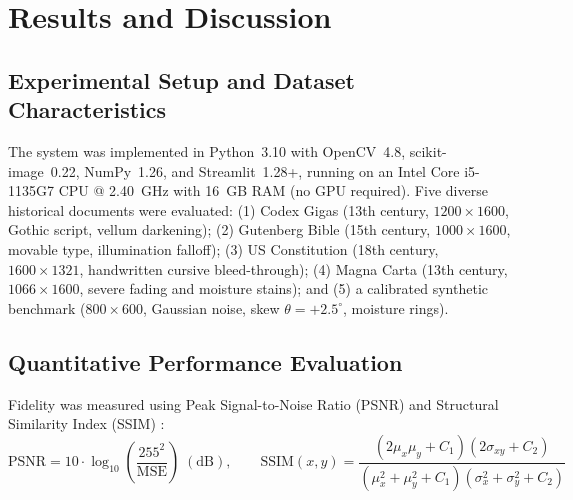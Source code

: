 \documentclass[11pt, a4paper]{article}
\begin{document}
\section{Results and Discussion}

\subsection{Experimental Setup and Dataset Characteristics}
The system was implemented in Python~3.10 with OpenCV~4.8, scikit-image~0.22, NumPy~1.26, and Streamlit~1.28+, running on an Intel Core i5-1135G7 CPU @ 2.40~GHz with 16~GB RAM (no GPU required). Five diverse historical documents were evaluated: (1) Codex Gigas (13th century, $1200 \times 1600$, Gothic script, vellum darkening); (2) Gutenberg Bible (15th century, $1000 \times 1600$, movable type, illumination falloff); (3) US Constitution (18th century, $1600 \times 1321$, handwritten cursive bleed-through); (4) Magna Carta (13th century, $1066 \times 1600$, severe fading and moisture stains); and (5) a calibrated synthetic benchmark ($800 \times 600$, Gaussian noise, skew $\theta = +2.5^\circ$, moisture rings).

\subsection{Quantitative Performance Evaluation}
Fidelity was measured using Peak Signal-to-Noise Ratio (PSNR) and Structural Similarity Index (SSIM) \cite{wang2004}:
\begin{equation}
\text{PSNR} = 10 \cdot \log_{10}\left( \frac{255^2}{\text{MSE}} \right) \; (\text{dB}), \qquad \text{SSIM}(x, y) = \frac{(2\mu_x \mu_y + C_1)(2\sigma_{xy} + C_2)}{(\mu_x^2 + \mu_y^2 + C_1)(\sigma_x^2 + \sigma_y^2 + C_2)}
\end{equation}
\end{document}
